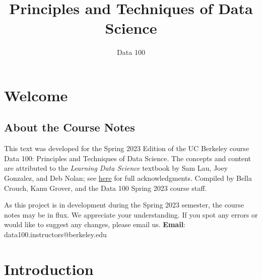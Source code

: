 \documentclass[
  letterpaper,
  DIV=11,
  numbers=noendperiod]{scrreprt}
\title{Principles and Techniques of Data Science}
\subtitle{Data 100}
\author{}
\date{}
\renewcommand*\contentsname{Table of contents}
\newcommand\contentsname{Table of contents}
\begin{document}
\maketitle
\ifdefined\Shaded\renewenvironment{Shaded}{\begin{tcolorbox}[enhanced, interior hidden, sharp corners, borderline west={3pt}{0pt}{shadecolor}, frame hidden, boxrule=0pt, breakable]}{\end{tcolorbox}}\fi

\renewcommand*\contentsname{Table of contents}
{
\hypersetup{linkcolor=}
\setcounter{tocdepth}{2}
\tableofcontents
}

\hypertarget{welcome}{%
\chapter*{Welcome}\label{welcome}}


\hypertarget{about-the-course-notes}{%
\section*{About the Course Notes}\label{about-the-course-notes}}


This text was developed for the Spring 2023 Edition of the UC Berkeley
course Data 100: Principles and Techniques of Data Science. The concepts
and content are attributed to the \emph{Learning Data Science} textbook
by Sam Lau, Joey Gonzalez, and Deb Nolan; see
\href{https://ds100.org/sp23/acks/}{here} for full acknowledgments.
Compiled by Bella Crouch, Kanu Grover, and the Data 100 Spring 2023
course staff.

As this project is in development during the Spring 2023 semester, the
course notes may be in flux. We appreciate your understanding. If you
spot any errors or would like to suggest any changes, please email us.
\textbf{Email}: data100.instructors@berkeley.edu


\hypertarget{introduction}{%
\chapter{Introduction}\label{introduction}}
\end{document}
